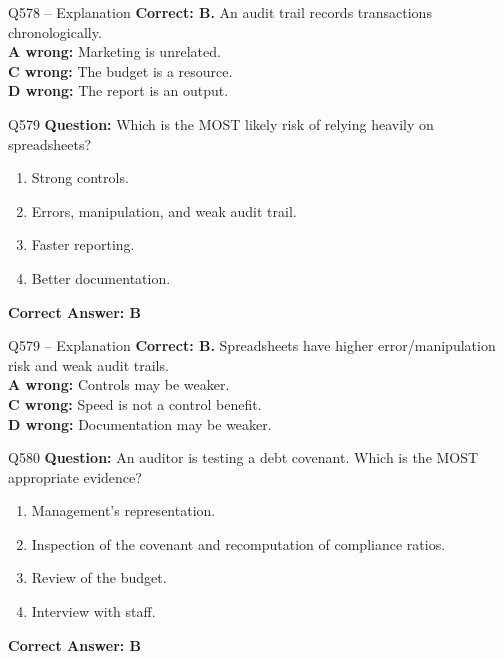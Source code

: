 \documentclass[aspectratio=169,10pt]{beamer}
\begin{document}
	\begin{frame}[t]{Q578 -- Explanation}
		\small
		\textbf{Correct: B.} An audit trail records transactions chronologically. \\[4pt]
		\textbf{A wrong:} Marketing is unrelated. \\[2pt]
		\textbf{C wrong:} The budget is a resource. \\[2pt]
		\textbf{D wrong:} The report is an output.
	\end{frame}
	
	\begin{frame}[t]{Q579}
		\small
		\textbf{Question:} Which is the MOST likely risk of relying heavily on spreadsheets?
		\begin{enumerate}[label=\Alph*.,itemsep=1pt,topsep=2pt]
			\item Strong controls.
			\item Errors, manipulation, and weak audit trail.
			\item Faster reporting.
			\item Better documentation.
		\end{enumerate}
		\vspace{4pt}
		\textbf{Correct Answer: B}
	\end{frame}
	
	\begin{frame}[t]{Q579 -- Explanation}
		\small
		\textbf{Correct: B.} Spreadsheets have higher error/manipulation risk and weak audit trails. \\[4pt]
		\textbf{A wrong:} Controls may be weaker. \\[2pt]
		\textbf{C wrong:} Speed is not a control benefit. \\[2pt]
		\textbf{D wrong:} Documentation may be weaker.
	\end{frame}
	
	\begin{frame}[t]{Q580}
		\small
		\textbf{Question:} An auditor is testing a debt covenant. Which is the MOST appropriate evidence?
		\begin{enumerate}[label=\Alph*.,itemsep=1pt,topsep=2pt]
			\item Management's representation.
			\item Inspection of the covenant and recomputation of compliance ratios.
			\item Review of the budget.
			\item Interview with staff.
		\end{enumerate}
		\vspace{4pt}
		\textbf{Correct Answer: B}
	\end{frame}
	
\end{document}
